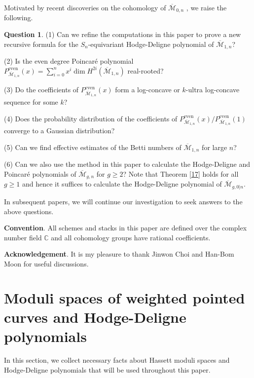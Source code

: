 \documentclass[11pt]{amsart}
\numberwithin{equation}{section}
\theoremstyle{definition}
\newtheorem{ques}[theo]{Question}
\newcommand{\CC}{\mathbb{C}}
\def\cM{{\mathcal M}}
\def\bcM{\overline{\cM}}
\begin{document}
\medskip

Motivated by recent discoveries on the cohomology of $\bcM_{0,n}$ \cite{BK, BKs,CK,CKL1,CKL2,CKL3}, we raise the following. 
\begin{ques}
(1)  Can we refine the computations in this paper to prove a new recursive formula for the $S_n$-equivariant Hodge-Deligne polynomial of $\bcM_{1,n}$? 

(2) Is the even degree Poincar\'e polynomial $P^{\mathrm{even}}_{\bcM_{1,n}}(x)=\sum_{i=0}^n x^i\dim H^{2i}(\bcM_{1,n})$ real-rooted?

(3) Do the coefficients of $P^{\mathrm{even}}_{\bcM_{1,n}}(x)$ form a log-concave or $k$-ultra log-concave sequence for some $k$?

(4) Does the probability distribution of the coefficients of $P^{\mathrm{even}}_{\bcM_{1,n}}(x)/P^{\mathrm{even}}_{\bcM_{1,n}}(1)$ converge to a Gaussian distribution? 

(5) Can we find effective estimates of the Betti numbers of $\bcM_{1,n}$ for large $n$? 

(6) Can we also use the method in this paper to calculate the Hodge-Deligne and Poincar\'e polynomials of $\bcM_{g,n}$ for $g\ge 2$? Note that Theorem \ref{17} holds for all $g\ge 1$ and hence it suffices to calculate the Hodge-Deligne polynomial of $\bcM_{g,0|n}$.
\end{ques}



In subsequent papers, we will continue our investigation to seek answers to the above questions. 

\medskip

\noindent\textbf{Convention}. 
All schemes and stacks in this paper are defined over the complex number field $\CC$
and all cohomology groups have rational coefficients. 

\medskip

\noindent\textbf{Acknowledgement}. It is my pleasure to thank Jinwon Choi and Han-Bom Moon for useful discussions. 

\bigskip

\section{Moduli spaces of weighted pointed curves and Hodge-Deligne polynomials}
In this section, we collect necessary facts about Hassett moduli spaces \cite{Hst} and Hodge-Deligne polynomials that will be used throughout this paper. 
\end{document}
